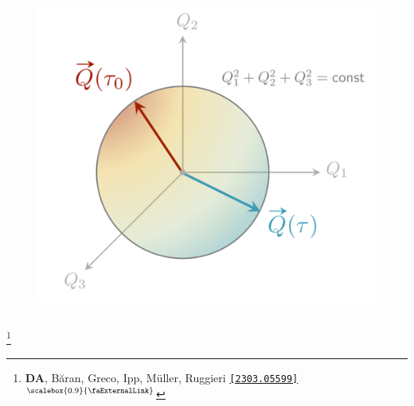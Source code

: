 \documentclass[aspectratio=169,11pt,usenames,dvipsnames]{beamer}
\renewcommand{\thefootnote}{\color{customblue}\faPaperPlaneO}
\newcommand\blfootnote[1]{%
  \begingroup
  \renewcommand\thefootnote{}\footnote{#1}%
  \addtocounter{footnote}{-1}%
  \endgroup
}
\begin{document}
\begin{frame}
\begin{columns}[onlytextwidth,t]
\begin{figure}[!hbt]
                \includegraphics[width=1.05\columnwidth]{images/wong_charge.png}
            \end{figure}
    \end{columns}

    \blfootnote{\scriptsize \textbf{DA}, Băran, Greco, Ipp, Müller, Ruggieri  \href{https://arxiv.org/abs/2303.05599}{{\color{palgold}\texttt{[2303.05599]}$^\text{\scalebox{0.9}{\faExternalLink}}$}}}
\end{frame}

\end{document}
